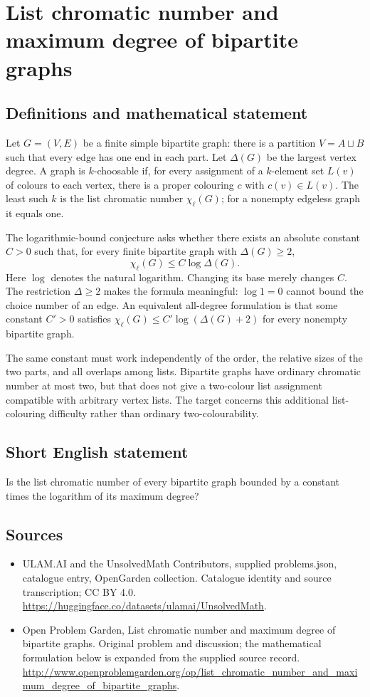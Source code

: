 \documentclass[11pt,a4paper]{article}
\begin{document}
\section*{List chromatic number and maximum degree of bipartite graphs}\label{statement}

\subsection{Definitions and mathematical statement}
Let $G=(V,E)$ be a finite simple bipartite graph: there is a partition
$V=A\sqcup B$ such that every edge has one end in each part. Let
$\Delta(G)$ be the largest vertex degree. A graph is $k$-choosable if, for
every assignment of a $k$-element set $L(v)$ of colours to each vertex,
there is a proper colouring $c$ with $c(v)\in L(v)$. The least such $k$
is the list chromatic number $\chi_\ell(G)$; for a nonempty edgeless graph
it equals one.

The logarithmic-bound conjecture asks whether there exists an absolute
constant $C>0$ such that, for every finite bipartite graph with
$\Delta(G)\ge2$,
\[
                      \chi_\ell(G)\le C\log\Delta(G).
\]
Here $\log$ denotes the natural logarithm. Changing its base merely
changes $C$. The restriction $\Delta\ge2$ makes the formula meaningful:
$\log1=0$ cannot bound the choice number of an edge. An equivalent
all-degree formulation is that some constant $C'>0$ satisfies
$\chi_\ell(G)\le C'\log(\Delta(G)+2)$ for every nonempty bipartite graph.

The same constant must work independently of the order, the relative
sizes of the two parts, and all overlaps among lists. Bipartite graphs
have ordinary chromatic number at most two, but that does not give a
two-colour list assignment compatible with arbitrary vertex lists.
The target concerns this additional list-colouring difficulty rather
than ordinary two-colourability.
\subsection{Short English statement}
Is the list chromatic number of every bipartite graph bounded by a constant times the logarithm of its maximum degree?
\subsection{Sources}
\begin{itemize}
\item[S1] ULAM.AI and the UnsolvedMath Contributors, supplied problems.json, catalogue entry, OpenGarden collection. Catalogue identity and source transcription; CC BY 4.0.
\url{https://huggingface.co/datasets/ulamai/UnsolvedMath}.
\item[S2] Open Problem Garden, List chromatic number and maximum degree of bipartite graphs. Original problem and discussion; the mathematical formulation below is expanded from the supplied source record.
\url{http://www.openproblemgarden.org/op/list_chromatic_number_and_maximum_degree_of_bipartite_graphs}.
\end{itemize}
\end{document}
